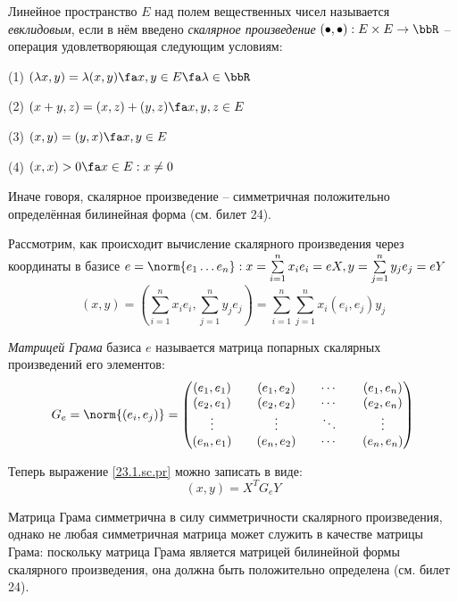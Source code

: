 \begin{defn}
Линейное пространство $E$ над полем вещественных чисел называется \textit{евклидовым}, если в нём введено \textit{скалярное произведение} $(\bullet,\bullet): E\times E \rightarrow \bbR$ -- операция удовлетворяющая следующим условиям:

(1) $(\lambda x,y)=\lambda(x,y) \fa x,y \in E \fa \lambda \in \bbR$

(2) $(x+y,z)=(x,z)+(y,z) \fa x,y,z \in E$

(3) $(x,y)=(y,x) \fa x,y \in E$

(4) $(x,x)>0 \fa x \in E: x \neq 0$
\end{defn}
  \begin{notion}
  Иначе говоря, скалярное произведение -- симметричная положительно определённая билинейная форма (см. билет 24).
  \end{notion}
  Рассмотрим, как происходит вычисление скалярного произведения через координаты в базисе $e=\norm{e_1 \ldots e_n}:x=\sum\limits_{i=1}^nx_ie_i=eX, y=\sum\limits_{j=1}^ny_je_j=eY$
  \begin{equation}\label{23.1.sc.pr}
  (x,y)=(\sum\limits_{i=1}^nx_ie_i,\sum\limits_{j=1}^ny_je_j)=\sum\limits_{i=1}^n\sum\limits_{j=1}^nx_i(e_i,e_j)y_j
  \end{equation}
  \begin{defn}
  \textit{Матрицей Грама} базиса $e$ называется матрица попарных скалярных произведений его элементов:
  \begin{equation}
  G_e=\norm{(e_i,e_j)}=\begin{pmatrix}
  (e_1,e_1)&&(e_1,e_2)&&\cdots&&(e_1,e_n)\\
  (e_2,e_1)&&(e_2,e_2)&&\cdots&&(e_2,e_n)\\
  \vdots   && \vdots  &&\ddots&& \vdots  \\
  (e_n,e_1)&&(e_n,e_2)&&\cdots&&(e_n,e_n)\\
  \end{pmatrix}
  \end{equation}
  \end{defn}
  Теперь выражение \ref{23.1.sc.pr} можно записать в виде:
  \begin{equation}
  (x,y)=X^TG_eY
  \end{equation}
  \begin{notion}
  Матрица Грама симметрична в силу симметричности скалярного произведения, однако не любая симметричная матрица может служить в качестве матрицы Грама: поскольку матрица Грама является матрицей билинейной формы скалярного произведения, она должна быть положительно определена (см. билет 24).
  \end{notion}
  
